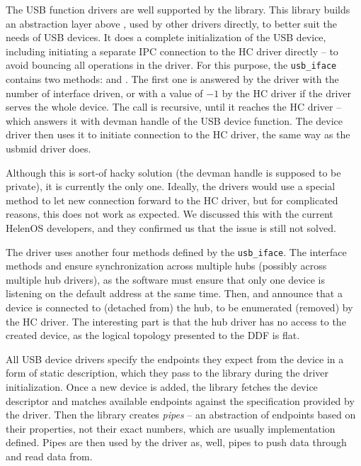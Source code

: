 The USB function drivers are well supported by the  library.
This library builds an abstraction layer above , used by other
drivers directly, to better suit the needs of USB devices. It does a complete
initialization of the USB device, including initiating a separate IPC
connection to the HC driver directly -- to avoid bouncing all operations in the
 driver. For this purpose, the \texttt{usb\_iface} contains two
methods:  and . The first one is
answered by the  driver with the number of interface driven, or
with a value of $-1$ by the HC driver if the driver serves the whole device.
The  call is recursive, until it reaches the HC
driver -- which answers it with devman handle of the USB device function. The
device driver then uses it to initiate connection to the HC driver, the same
way as the usbmid driver does.

Although this is sort-of hacky solution (the devman handle is supposed to be
private), it is currently the only one. Ideally, the drivers would use
a special method to let new connection forward to the HC driver, but for
complicated reasons, this does not work as expected. We discussed this with the
current HelenOS developers, and they confirmed us that the issue is still not
solved.

The  driver uses another four methods defined by the
\texttt{usb\_iface}. The interface methods  and
 ensure synchronization across multiple hubs
(possibly across multiple hub drivers), as the software must ensure that only one
device is listening on the default address at the same time. Then,
 and  announce that a device is
connected to (detached from) the hub, to be enumerated (removed) by the HC
driver. The interesting part is that the hub driver has no access to the
created device, as the logical topology presented to the DDF is flat.

All USB device drivers specify the endpoints they expect from the device in
a form of static description, which they pass to the  library
during the driver initialization. Once a new device is added, the library
fetches the device descriptor and matches available endpoints against the
specification provided by the driver. Then the library creates \emph{pipes} --
an abstraction of endpoints based on their properties, not their exact numbers,
which are usually implementation defined. Pipes are then used by the driver
as, well, pipes to push data through and read data from.

